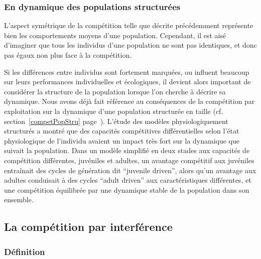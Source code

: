 \subsubsection{En dynamique des populations structurées}

L'aspect symétrique de la compétition telle que décrite précédemment représente
bien les comportements moyens d'une population. Cependant, il est aisé
d'imaginer que tous les individus d'une population ne sont pas identiques, et
donc pas égaux non plus face à la compétition. 

Si les différences entre individus sont fortement marquées, ou influent
beaucoup sur leurs performances individuelles et écologiques, il devient alors
important de considérer la structure de la population lorsque l'on cherche à
décrire sa dynamique. Nous avons déjà fait référence au conséquences de la
compétition par exploitation sur la dynamique d'une population structurée en
taille (cf. section~\ref{competPopStru} page~\pageref{competPopStru}). L'étude
des modèles physiologiquement structurés a montré que des capacités compétitives différentielles selon l'état
physiologique de l'individu avaient un impact très fort sur la dynamique que
suivait la population. Dans un modèle simplifié en deux stades aux capacités de
compétition différentes, juvéniles et adultes, un avantage compétitif aux
juvéniles entraînait des cycles de génération dit ``juvenile driven'', alors
qu'un avantage aux adultes conduisait à des cycles ``adult driven'' aux caractéristiques
différentes, et une compétition équilibrée par une dynamique stable de la
population dans son ensemble. 


\subsection{La compétition par interférence}

\subsubsection{Définition}

